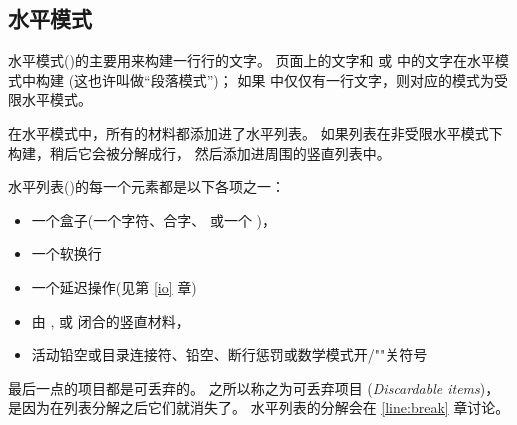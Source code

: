 \documentclass{book}
\begin{document}
\subsection{水平模式}

水平模式()的主要用来构建一行行的文字。
页面上的文字和  或  中的文字在水平模式中构建
(这也许叫做“段落模式”)；
如果  中仅仅有一行文字，则对应的模式为受限水平模式。

在水平模式中，所有的材料都添加进了水平列表。
如果列表在非受限水平模式下构建，稍后它会被分解成行，
然后添加进周围的竖直列表中。

水平列表()的每一个元素都是以下各项之一：
\begin{itemize}
  \item 一个盒子(一个字符、合字、 或一个 )，
  \item 一个软换行
  \item 一个延迟操作(见第 \ref{io} 章)
  \item 由 ,  或  闭合的竖直材料，
  \item 
\mdqon
活动铅空或目录连接符、铅空、断行惩罚或数学模式开/""关符号
\mdqoff
\end{itemize}
最后一点的项目都是可丢弃的。
之所以称之为可丢弃项目
(\emph{Discardable items})，
是因为在列表分解之后它们就消失了。
水平列表的分解会在 \ref{line:break} 章讨论。
\end{document}
